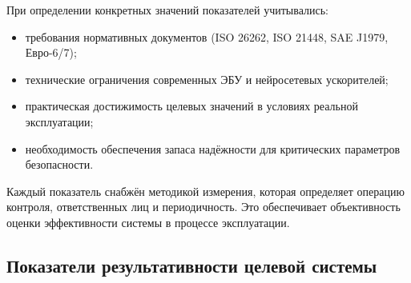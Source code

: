 \documentclass[14pt, a4paper]{extarticle}
\begin{document}
				При определении конкретных значений показателей учитывались:
				\begin{itemize}
					\item требования нормативных документов (ISO 26262, ISO 21448, SAE J1979, Евро-6/7); 
					\item технические ограничения современных ЭБУ и нейросетевых ускорителей;
					\item практическая достижимость целевых значений в условиях реальной эксплуатации;
					\item необходимость обеспечения запаса надёжности для критических параметров безопасности.
				\end{itemize}
				
				Каждый показатель снабжён методикой измерения, которая определяет операцию контроля, ответственных лиц и периодичность. Это обеспечивает объективность оценки эффективности системы в процессе эксплуатации.
				
			\subsection{Показатели результативности целевой системы}
			
				\vspace{\parindent}
				
\end{document}
